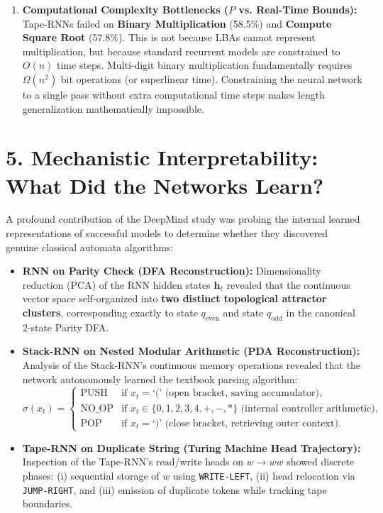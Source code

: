 \documentclass[11pt,a4paper]{article}
\begin{document}
\begin{enumerate}[leftmargin=1.5em, itemsep=4pt]
    \item \textbf{Computational Complexity Bottlenecks ($P$ vs. Real-Time Bounds):}
    Tape-RNNs failed on \textbf{Binary Multiplication} (58.5\%) and \textbf{Compute Square Root} (57.8\%). This is not because LBAs cannot represent multiplication, but because standard recurrent models are constrained to $O(n)$ time steps. Multi-digit binary multiplication fundamentally requires $\Omega(n^2)$ bit operations (or superlinear time). Constraining the neural network to a single pass without extra computational time steps makes length generalization mathematically impossible.
\end{enumerate}

\section{5. Mechanistic Interpretability: What Did the Networks Learn?}

A profound contribution of the DeepMind study was probing the internal learned representations of successful models to determine whether they discovered genuine classical automata algorithms:

\begin{itemize}[leftmargin=1.5em, itemsep=4pt]
    \item \textbf{RNN on Parity Check (DFA Reconstruction):}
    Dimensionality reduction (PCA) of the RNN hidden states $\mathbf{h}_t$ revealed that the continuous vector space self-organized into \textbf{two distinct topological attractor clusters}, corresponding exactly to state $q_{\text{even}}$ and state $q_{\text{odd}}$ in the canonical 2-state Parity DFA.
    \item \textbf{Stack-RNN on Nested Modular Arithmetic (PDA Reconstruction):}
    Analysis of the Stack-RNN's continuous memory operations revealed that the network autonomously learned the textbook parsing algorithm:
    \begin{equation}
        \sigma(x_t) = \begin{cases}
            \text{PUSH} & \text{if } x_t = \text{`(' (open bracket, saving accumulator)}, \\
            \text{NO\_OP} & \text{if } x_t \in \{0, 1, 2, 3, 4, +, -, *\} \text{ (internal controller arithmetic)}, \\
            \text{POP} & \text{if } x_t = \text{`)'} \text{ (close bracket, retrieving outer context)}.
        \end{cases}
    \end{equation}
    \item \textbf{Tape-RNN on Duplicate String (Turing Machine Head Trajectory):}
    Inspection of the Tape-RNN's read/write heads on $w \to ww$ showed discrete phases: (i) sequential storage of $w$ using \texttt{WRITE-LEFT}, (ii) head relocation via \texttt{JUMP-RIGHT}, and (iii) emission of duplicate tokens while tracking tape boundaries.
\end{itemize}
\end{document}
